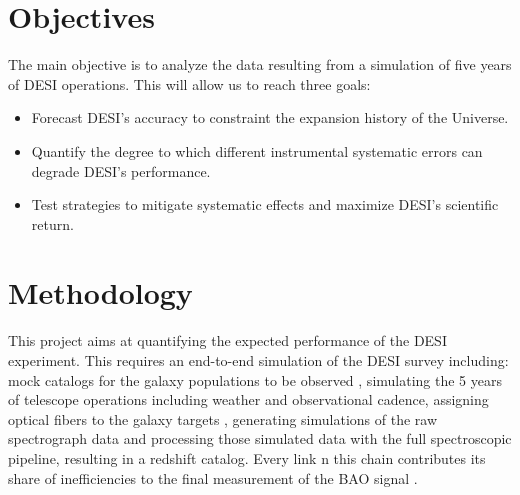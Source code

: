 \documentclass[12pt]{article}
\begin{document}
 




\section*{Objectives}

The main objective is to analyze the data resulting from a simulation
of five years of DESI operations.  
This will allow us to reach three goals:

\begin{itemize}
\item Forecast DESI's accuracy to constraint the expansion
  history of the Universe.  
\item Quantify the degree to which different instrumental systematic
  errors can degrade DESI's performance.
\item Test strategies to mitigate systematic effects and maximize
  DESI's scientific return.
\end{itemize}


\section*{Methodology}


This project aims at quantifying the expected performance of the DESI
experiment. 
This requires an end-to-end simulation of the DESI survey including:
mock catalogs for the galaxy populations to be
  observed \cite{2015AAS...22533607S}, simulating the 5 years of
  telescope operations including weather and observational cadence, assigning optical fibers to the
  galaxy targets \cite{2015AAS...22533610C}, generating simulations
  of the raw spectrograph data \cite{2015AAS...22533608E} and
  processing those simulated data with the full spectroscopic pipeline, resulting in a redshift catalog. Every link n this chain
  contributes its share of inefficiencies to the final measurement of
  the BAO signal \cite{2015AAS...22533605E}.
\end{document}
